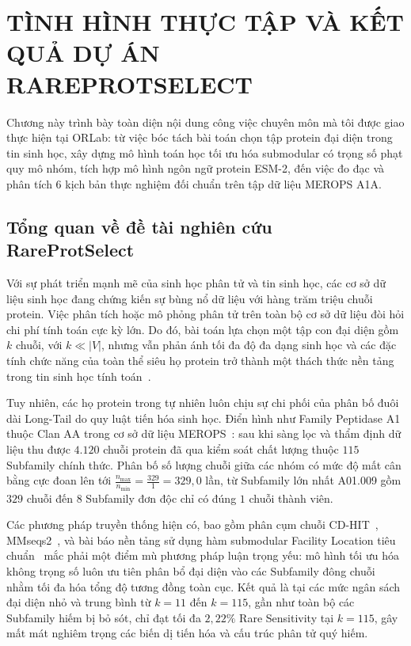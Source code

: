 \chapter{TÌNH HÌNH THỰC TẬP VÀ KẾT QUẢ DỰ ÁN RAREPROTSELECT}
\label{chap:tinh_hinh_du_an}

Chương này trình bày toàn diện nội dung công việc chuyên môn mà tôi được giao thực hiện tại ORLab: từ việc bóc tách bài toán chọn tập protein đại diện trong tin sinh học, xây dựng mô hình toán học tối ưu hóa submodular có trọng số phạt quy mô nhóm, tích hợp mô hình ngôn ngữ protein ESM-2, đến việc đo đạc và phân tích 6 kịch bản thực nghiệm đối chuẩn trên tập dữ liệu MEROPS A1A.

\section{Tổng quan về đề tài nghiên cứu RareProtSelect}
\label{sec:tong_quan_du_an}

Với sự phát triển mạnh mẽ của sinh học phân tử và tin sinh học, các cơ sở dữ liệu sinh học đang chứng kiến sự bùng nổ dữ liệu với hàng trăm triệu chuỗi protein. Việc phân tích hoặc mô phỏng phân tử trên toàn bộ cơ sở dữ liệu đòi hỏi chi phí tính toán cực kỳ lớn. Do đó, bài toán lựa chọn một tập con đại diện gồm $k$ chuỗi, với $k \ll |V|$, nhưng vẫn phản ánh tối đa độ đa dạng sinh học và các đặc tính chức năng của toàn thể siêu họ protein trở thành một thách thức nền tảng trong tin sinh học tính toán~\cite{nguyen2025}.

Tuy nhiên, các họ protein trong tự nhiên luôn chịu sự chi phối của phân bố đuôi dài Long-Tail do quy luật tiến hóa sinh học. Điển hình như Family Peptidase A1 thuộc Clan AA trong cơ sở dữ liệu MEROPS~\cite{merops}: sau khi sàng lọc và thẩm định dữ liệu thu được $4.120$ chuỗi protein đã qua kiểm soát chất lượng thuộc $115$ Subfamily chính thức. Phân bố số lượng chuỗi giữa các nhóm có mức độ mất cân bằng cực đoan lên tới $\frac{n_{\max}}{n_{\min}} = \frac{329}{1} = 329{,}0$ lần, từ Subfamily lớn nhất A01.009 gồm $329$ chuỗi đến $8$ Subfamily đơn độc chỉ có đúng $1$ chuỗi thành viên.

Các phương pháp truyền thống hiện có, bao gồm phân cụm chuỗi CD-HIT~\cite{cdhit}, MMseqs2~\cite{mmseqs2}, và bài báo nền tảng sử dụng hàm submodular Facility Location tiêu chuẩn~\cite{nguyen2025} mắc phải một điểm mù phương pháp luận trọng yếu: mô hình tối ưu hóa không trọng số luôn ưu tiên phân bổ đại diện vào các Subfamily đông chuỗi nhằm tối đa hóa tổng độ tương đồng toàn cục. Kết quả là tại các mức ngân sách đại diện nhỏ và trung bình từ $k = 11$ đến $k = 115$, gần như toàn bộ các Subfamily hiếm bị bỏ sót, chỉ đạt tối đa $2{,}22\%$ Rare Sensitivity tại $k = 115$, gây mất mát nghiêm trọng các biến dị tiến hóa và cấu trúc phân tử quý hiếm.

